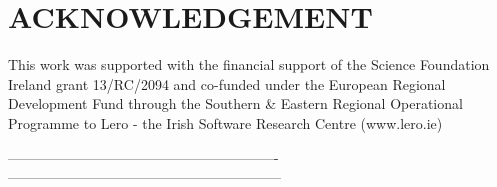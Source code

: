 \documentclass[a4paper,twoside]{article}
\begin{document}
\section*{ACKNOWLEDGEMENT}
\noindent This work was supported with the financial support of the Science Foundation Ireland grant 13/RC/2094 and co-funded under the European Regional Development Fund through the Southern \& Eastern Regional Operational Programme to Lero - the Irish Software Research Centre (www.lero.ie)


{\small
}

\noindent----------------------------------------------------------
-----------------------------------------------------------



\vfill
\end{document}
